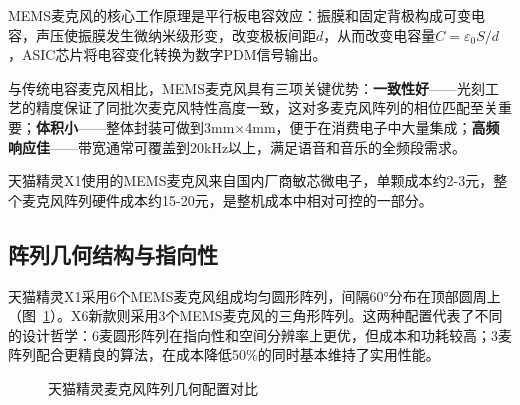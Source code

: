 \documentclass[12pt, a4paper, twoside, openright]{book}
\begin{document}
MEMS麦克风的核心工作原理是平行板电容效应：振膜和固定背极构成可变电容，声压使振膜发生微纳米级形变，改变极板间距$d$，从而改变电容量$C = \varepsilon_0 S / d$，ASIC芯片将电容变化转换为数字PDM信号输出。

与传统电容麦克风相比，MEMS麦克风具有三项关键优势：\textbf{一致性好}——光刻工艺的精度保证了同批次麦克风特性高度一致，这对多麦克风阵列的相位匹配至关重要；\textbf{体积小}——整体封装可做到3mm×4mm，便于在消费电子中大量集成；\textbf{高频响应佳}——带宽通常可覆盖到20kHz以上，满足语音和音乐的全频段需求。

天猫精灵X1使用的MEMS麦克风来自国内厂商敏芯微电子，单颗成本约2-3元，整个麦克风阵列硬件成本约15-20元，是整机成本中相对可控的一部分。

\subsection{阵列几何结构与指向性}

天猫精灵X1采用6个MEMS麦克风组成均匀圆形阵列，间隔60°分布在顶部圆周上（图~\ref{fig:mic-array}）。X6新款则采用3个MEMS麦克风的三角形阵列。这两种配置代表了不同的设计哲学：6麦圆形阵列在指向性和空间分辨率上更优，但成本和功耗较高；3麦阵列配合更精良的算法，在成本降低50\%的同时基本维持了实用性能。

\begin{figure}[H]
\centering
{}
\caption{天猫精灵麦克风阵列几何配置对比}
\label{fig:mic-array}
\end{figure}
\end{document}
